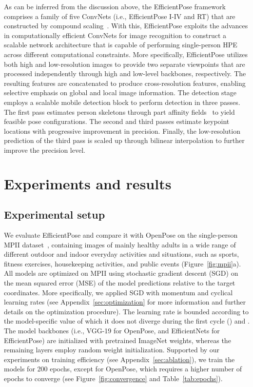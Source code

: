 As can be inferred from the discussion above, the EfficientPose framework comprises a family of five ConvNets (i.e., EfficientPose I-IV and RT) that are constructed by compound scaling~\cite{tan2019efficientnet}. With this, EfficientPose exploits the advances in computationally efficient ConvNets for image recognition to construct a scalable network architecture that is capable of performing single-person HPE across different computational constraints. More specifically, EfficientPose utilizes both high and low-resolution images to provide two separate viewpoints that are processed independently through high and low-level backbones, respectively. The resulting features are concatenated to produce cross-resolution features, enabling selective emphasis on global and local image information. The detection stage employs a scalable mobile detection block to perform detection in three passes. The first pass estimates person skeletons through part affinity fields~\cite{cao2017realtime} to yield feasible pose configurations. The second and third passes estimate keypoint locations with progressive improvement in precision. Finally, the low-resolution prediction of the third pass is scaled up through bilinear interpolation to further improve the precision level. 


\section{Experiments and results}
\label{sec:experiments}

\subsection{Experimental setup}
\label{sec:setup}

We evaluate EfficientPose and compare it with OpenPose on the single-person MPII dataset~\cite{andriluka14cvpr}, containing images of mainly healthy adults in a wide range of different outdoor and indoor everyday activities and situations, such as sports, fitness exercises, housekeeping activities, and public events (Figure~\ref{fig:mpii}a). All models are optimized on MPII using stochastic gradient descent (SGD) on the mean squared error (MSE) of the model predictions relative to the target coordinates. More specifically, we applied SGD with momentum and cyclical learning rates (see Appendix~\ref{sec:optimization} for more information and further details on the optimization procedure). The learning rate is bounded according to the model-specific value of which it does not diverge during the first cycle () and . The model backbones (i.e., VGG-19 for OpenPose, and EfficientNets for EfficientPose) are initialized with pretrained ImageNet weights, whereas the remaining layers employ random weight initialization. Supported by our experiments on training efficiency (see Appendix~\ref{sec:ablation}), we train the models for 200 epochs, except for OpenPose, which requires a higher number of epochs to converge (see Figure~\ref{fig:convergence} and Table~\ref{tab:epochs}). 

